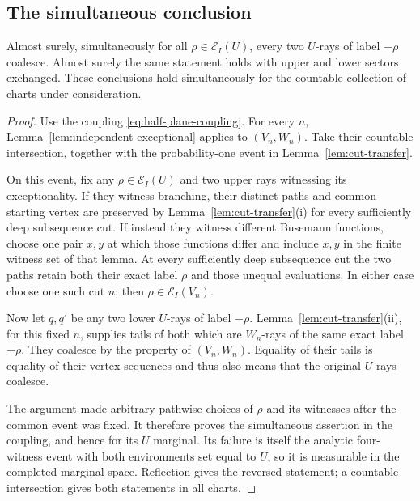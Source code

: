 \subsection{The simultaneous conclusion}

\begin{proposition}
\label{prop:opposite-coalescence}
Almost surely, simultaneously for all $\rho\in\mathcal E_I(U)$,
every two $U$-rays of label $-\rho$ coalesce.  Almost surely the same
statement holds with upper and lower sectors exchanged.  These
conclusions hold simultaneously for the countable collection of
charts under consideration.
\end{proposition}

\begin{proof}
Use the coupling \eqref{eq:half-plane-coupling}.  For every $n$,
Lemma~\ref{lem:independent-exceptional} applies to $(V_n,W_n)$.
Take their countable intersection, together with the
probability-one event in Lemma~\ref{lem:cut-transfer}.

On this event, fix any $\rho\in\mathcal E_I(U)$ and two upper rays
witnessing its exceptionality.  If they witness branching, their
distinct paths and common starting vertex are preserved by
Lemma~\ref{lem:cut-transfer}(i) for every sufficiently deep
subsequence cut.  If instead they witness different Busemann
functions, choose one pair $x,y$ at which those functions differ
and include $x,y$ in the finite witness set of that lemma.  At
every sufficiently deep subsequence cut the two paths retain both
their exact label $\rho$ and those unequal evaluations.  In either
case choose one such cut $n$; then
$\rho\in\mathcal E_I(V_n)$.

Now let $q,q'$ be any two lower $U$-rays of label $-\rho$.
Lemma~\ref{lem:cut-transfer}(ii), for this fixed $n$, supplies tails
of both which are $W_n$-rays of the same exact label $-\rho$.
They coalesce by the property of $(V_n,W_n)$.  Equality of their
tails is equality of their vertex sequences and thus also means
that the original $U$-rays coalesce.

The argument made arbitrary pathwise choices of $\rho$ and its
witnesses after the common event was fixed.  It therefore proves
the simultaneous assertion in the coupling, and hence for its
$U$ marginal.  Its failure is itself the analytic four-witness
event with both environments set equal to $U$, so it is measurable
in the completed marginal space.  Reflection gives the reversed
statement; a countable intersection gives both statements in all
charts.
\end{proof}
